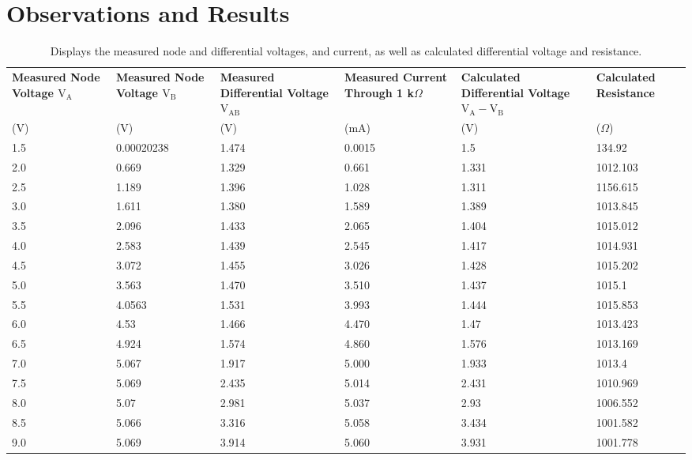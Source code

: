 \documentclass{article}
\begin{document}
\section{Observations and Results}

\begin{table}[H]
\begin{tabularx}{\textwidth}{ | X | X | X | X | X | X | }
	\hline
	\textbf{Measured Node Voltage $\text{V}_\text{A}$} &
	\textbf{Measured Node Voltage $\text{V}_\text{B}$} &
	\textbf{Measured Differential Voltage $\text{V}_\text{AB}$} &
	\textbf{Measured Current Through 1 k$\Omega$} &
	\textbf{Calculated Differential Voltage $\text{V}_\text{A}-\text{V}_\text{B}$} &
	\textbf{Calculated Resistance} \\
	(V) & (V) & (V) & (mA) & (V) & ($\Omega$) \\
	\hline
	1.5 & 0.00020238 & 1.474 & 0.0015 & 1.5  & 134.92 \\
	2.0 & 0.669      & 1.329 & 0.661 & 1.331 & 1012.103  \\
	2.5 & 1.189      & 1.396 & 1.028 & 1.311 & 1156.615 \\
	3.0 & 1.611      & 1.380 & 1.589 & 1.389 & 1013.845 \\
	3.5 & 2.096      & 1.433 & 2.065 & 1.404 & 1015.012 \\
	4.0 & 2.583      & 1.439 & 2.545 & 1.417 & 1014.931 \\
	4.5 & 3.072      & 1.455 & 3.026 & 1.428 & 1015.202 \\
	5.0 & 3.563      & 1.470 & 3.510 & 1.437 & 1015.1 \\
	5.5 & 4.0563     & 1.531 & 3.993 & 1.444 & 1015.853 \\
	6.0 & 4.53       & 1.466 & 4.470 & 1.47  & 1013.423 \\
	6.5 & 4.924      & 1.574 & 4.860 & 1.576 & 1013.169 \\
	7.0 & 5.067      & 1.917 & 5.000 & 1.933 & 1013.4 \\
	7.5 & 5.069      & 2.435 & 5.014 & 2.431 & 1010.969 \\
	8.0 & 5.07       & 2.981 & 5.037 & 2.93  & 1006.552 \\
	8.5 & 5.066      & 3.316 & 5.058 & 3.434 & 1001.582 \\
	9.0 & 5.069      & 3.914 & 5.060 & 3.931 & 1001.778 \\
	\hline
\end{tabularx}
\caption{\label{tab:table-name}Displays the measured node and differential voltages, and current, as well as calculated differential voltage and resistance.}
\end{table}
\end{document}
